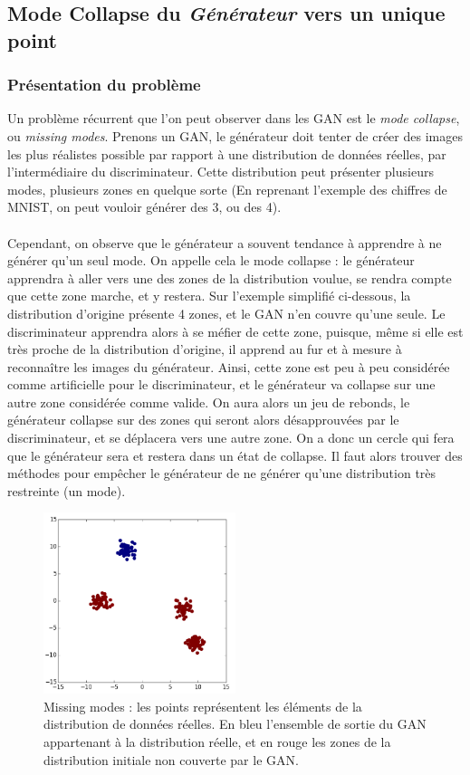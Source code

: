 \subsection{Mode Collapse du \textit{Générateur} vers un unique point}
\subsubsection{Présentation du problème}

Un problème récurrent que l'on peut observer dans les GAN est le \textit{mode collapse}, ou \textit{missing modes}. Prenons un GAN, le générateur doit tenter de créer des images les plus réalistes possible par rapport à une distribution de données réelles, par l'intermédiaire du discriminateur. Cette distribution peut présenter plusieurs modes, plusieurs zones en quelque sorte (En reprenant l'exemple des chiffres de MNIST, on peut vouloir générer des 3, ou des 4). 
\\ \\
Cependant, on observe que le générateur a souvent tendance à apprendre à ne générer qu'un seul mode. On appelle cela le mode collapse : le générateur apprendra à aller vers une des zones de la distribution voulue, se rendra compte que cette zone marche, et y restera. 
Sur l'exemple simplifié ci-dessous, la distribution d'origine présente 4 zones, et le GAN n'en couvre qu'une seule.
Le discriminateur apprendra alors à se méfier de cette zone, puisque, même si elle est très proche de la distribution d'origine, il apprend au fur et à mesure à reconnaître les images du générateur. Ainsi, cette zone est peu à peu considérée comme artificielle pour le discriminateur, et le générateur va collapse sur une autre zone considérée comme valide. On aura alors un jeu de rebonds, le générateur collapse sur des zones qui seront alors désapprouvées par le discriminateur, et se déplacera vers une autre zone. 
On a donc un cercle qui fera que le générateur sera et restera dans un état de collapse. 
Il faut alors trouver des méthodes pour empêcher le générateur de ne générer qu'une distribution très restreinte (un mode).

\begin{figure}[h]
\begin{center}
\includegraphics[width=0.5\textwidth]{images/missing_modes.png}\caption{Missing modes : les points représentent les éléments de la distribution de données réelles. En bleu l'ensemble de sortie du GAN appartenant à la distribution réelle, et en rouge les zones de la distribution initiale non couverte par le GAN.}
\end{center}
\end{figure} 

